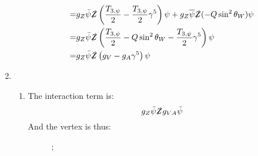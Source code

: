 \documentclass[12pt,a4]{article}
\begin{document}
\begin{enumerate}
\begin{enumerate}
\begin{align*}
          =               & g_Z \bar{\psi} \slashed{Z}  \left(\frac{T_{3, \psi}}{2}  -  \frac{T_{3, \psi}}{2} \gamma^5 \right) \psi  + g_Z \overline{\psi} \slashed{Z}( - Q \sin^2 \theta_W ) \psi \\
          =               & g_Z \bar{\psi} \slashed{Z}  \left(\frac{T_{3, \psi}}{2} - Q \sin^2 \theta_W -  \frac{T_{3, \psi}}{2} \gamma^5 \right) \psi \\
          =               & g_Z \bar{\psi} \slashed{Z}  \left(g_V -  g_A \gamma^5 \right) \psi
        \end{align*}
    \end{enumerate}
  \item
    \begin{enumerate}
      \item
        The interaction term is:
        \begin{equation*}
          g_Z \bar{\psi} \slashed{Z} g_{V A} \bar{\psi}
        \end{equation*}
        And the vertex is thus:
        \begin{figure}[!ht]
          \centering
          ;
        \end{figure}


\end{enumerate}
\end{enumerate}
\end{document}
